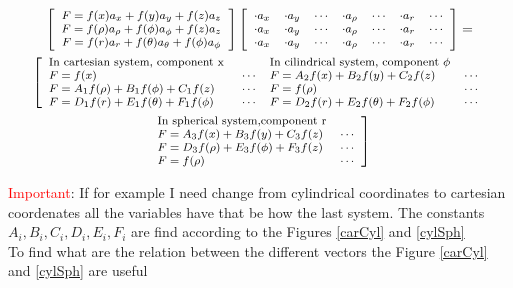 \documentclass[12pt,letterpaper]{book}
\begin{document}
\begin{multline}
\label{cooTra}
\footnotesize{\left[\begin{array}{c}
F=f(x)a_x+f(y)a_y+f(z)a_z\\
F=f({\rho })a_{\rho }+f({\phi })a_{\phi }+f(z)a_z\\
F=f({r })a_{r}+f({\theta })a_{\theta }+f({\phi })a_{\phi }
\end{array}\right]
\left[\begin{array}{ccccccc}
\cdot a_x &\cdot a_y&\cdots &\cdot a_{\rho }&\cdots &\cdot a_r &\cdots \\
\cdot a_x &\cdot a_y&\cdots &\cdot a_{\rho }&\cdots &\cdot a_r &\cdots \\
\cdot a_x &\cdot a_y&\cdots &\cdot a_{\rho }&\cdots &\cdot a_r &\cdots 
\end{array}\right]=}\\
\footnotesize{ \left[\begin{array}{lclclc}
\text{In cartesian system, component x } & &\text{In cilindrical system, component }\phi &  \\
F=f(x)														&	\cdots &F=A_2f(x)+B_2f(y) +C_2f(z)				&\cdots  \\
F=A_1f(\rho )+B_1f(\phi )+C_1f(z) 	&\cdots &F=f(\rho )												&\cdots \\
F=D_1f(r)+E_1f(\theta )+F_1f(\phi ) 	&\cdots &F=D_2f(r)+E_2f(\theta )+F_2f(\phi )  &\cdots  
\end{array}\right.}\\
\footnotesize{ \left.\begin{array}{lclclc}
\text{In spherical system,component r}& \\
F=A_3f(x)+B_3f(y) +C_3f(z)		&\cdots \\
F=D_3f(\rho )+E_3f(\phi )+F_3f(z) &\cdots \\
F=f(\rho )											&\cdots 
\end{array}\right]}
\end{multline}

\textcolor{red}{Important}: If for example I need change from cylindrical coordinates to cartesian coordenates all the variables have that be how the last system. The constants $A_i,B_i,C_i,D_i,E_i,F_i$ are find according to the Figures \ref{carCyl} and \ref{cylSph} \\

To find what are the relation between the different vectors the Figure \ref{carCyl} and \ref{cylSph} are useful
\end{document}
